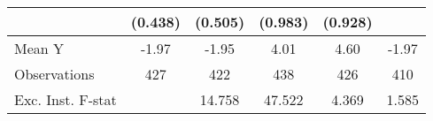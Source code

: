 {\begin{tabular}{l*{5}{c}}
            &     (0.438)         &     (0.505)         &     (0.983)         &     (0.928)         &                     \\
\midrule
Mean Y      &       -1.97         &       -1.95         &        4.01         &        4.60         &       -1.97         \\
Observations&         427         &         422         &         438         &         426         &         410         \\
Exc. Inst. F-stat&                     &      14.758         &      47.522         &       4.369         &       1.585         \\
\bottomrule
\end{tabular}
}
